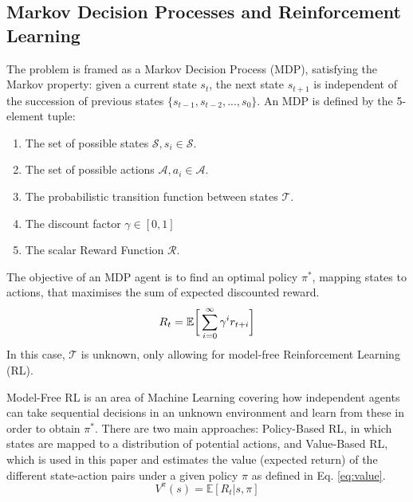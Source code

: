 \documentclass[conference]{IEEEtran}
\begin{document}
\subsection{Markov Decision Processes and Reinforcement Learning}
The problem is framed as a Markov Decision Process (MDP), satisfying the Markov property: given a current state $s_t$, the next state $s_{t+1}$ is independent of the succession of previous states $\{s_{t-1}, s_{t-2}, ..., s_0\}$.
An MDP is defined by the 5-element tuple:
\begin{enumerate}
\item The set of possible states $\mathcal{S}, s_i\in \mathcal{S}$.
\item The set of possible actions $\mathcal{A}, a_i\in \mathcal{A}$.
\item The probabilistic transition function between states $\mathcal{T}$.
\item The discount factor $\gamma \in [0,1]$ 
\item The scalar Reward Function $\mathcal{R}$. 
\end{enumerate}

The objective of an MDP agent is to find an optimal policy $\pi^*$, mapping states to actions, that maximises the sum of expected discounted reward.
\begin{equation}
R_t = \mathbb{E} \bigg{[} \sum^{\infty}_{i=0} \gamma^i r_{t+i} \bigg{]} 
\label{eq:reward}
\end{equation}
In this case, $\mathcal{T}$ is unknown, only allowing for model-free Reinforcement Learning (RL).

Model-Free RL is an area of Machine Learning covering how independent agents can take sequential decisions in an unknown environment and learn from these in order to obtain $\pi^*$. 
There are two main approaches: Policy-Based RL, in which states are mapped to a distribution of potential actions, and Value-Based RL, which is used in this paper and estimates the value (expected return) of the different state-action pairs under a given policy $\pi$ as defined in Eq. \ref{eq:value}.
\begin{equation}
V^{\pi}(s) = \mathbb{E} [R_t|s,\pi]
\label{eq:value}
\end{equation}
\end{document}
